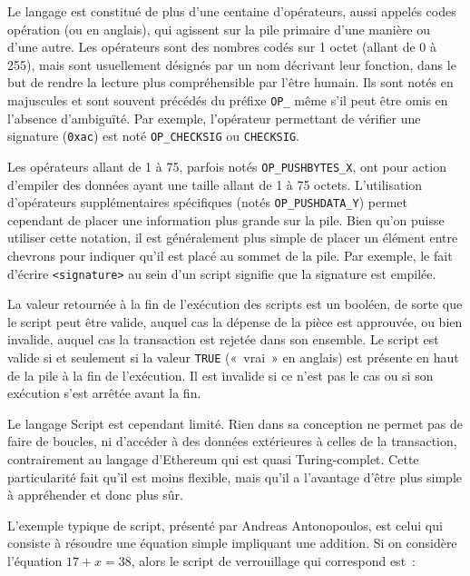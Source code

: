 Le langage est constitué de plus d'une centaine d'opérateurs, aussi appelés codes opération (ou  en anglais), qui agissent sur la pile primaire d'une manière ou d'une autre. Les opérateurs sont des nombres codés sur 1 octet (allant de 0 à 255), mais sont usuellement désignés par un nom décrivant leur fonction, dans le but de rendre la lecture plus compréhensible par l'être humain. Ils sont notés en majuscules et sont souvent précédés du préfixe \texttt{OP\_} même s'il peut être omis en l'absence d'ambiguïté. Par exemple, l'opérateur permettant de vérifier une signature (\texttt{0xac}) est noté \texttt{OP\_CHECKSIG} ou \texttt{CHECKSIG}.

Les opérateurs allant de 1 à 75, parfois notés \texttt{OP\_PUSHBYTES\_X}, ont pour action d'empiler des données ayant une taille allant de 1 à 75 octets. L'utilisation d'opérateurs supplémentaires spécifiques (notés \texttt{OP\_PUSHDATA\_Y}) permet cependant de placer une information plus grande sur la pile. Bien qu'on puisse utiliser cette notation, il est généralement plus simple de placer un élément entre chevrons pour indiquer qu'il est placé au sommet de la pile. Par exemple, le fait d'écrire \texttt{<signature>} au sein d'un script signifie que la signature est empilée.

La valeur retournée à la fin de l'exécution des scripts est un booléen, de sorte que le script peut être valide, auquel cas la dépense de la pièce est approuvée, ou bien invalide, auquel cas la transaction est rejetée dans son ensemble. Le script est valide si et seulement si la valeur \texttt{TRUE} («~vrai~» en anglais) est présente en haut de la pile à la fin de l'exécution. Il est invalide si ce n'est pas le cas ou si son exécution s'est arrêtée avant la fin.

Le langage Script est cependant limité. Rien dans sa conception ne permet pas de faire de boucles, ni d'accéder à des données extérieures à celles de la transaction, contrairement au langage d'Ethereum qui est quasi Turing-complet. Cette particularité fait qu'il est moins flexible, mais qu'il a l'avantage d'être plus simple à appréhender et donc plus sûr.

L'exemple typique de script, présenté par Andreas Antonopoulos, est celui qui consiste à résoudre une équation simple impliquant une addition. Si on considère l'équation $17 + x = 38$, alors le script de verrouillage qui correspond est~:

